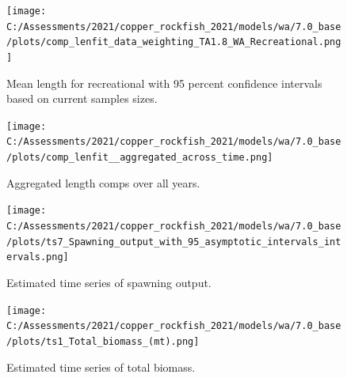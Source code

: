 \documentclass[11pt,
  english,
  a4paper,
]{article}
\begin{document}
\tagmcend\tagstructend


\begin{figure}
\centering
\texttt{[image: C:/Assessments/2021/copper\_rockfish\_2021/models/wa/7.0\_base/plots/comp\_lenfit\_data\_weighting\_TA1.8\_WA\_Recreational.png]}
\caption{Mean length for recreational with 95 percent confidence intervals based on current samples sizes.\label{fig:rec-mean-len-fit}}
\end{figure}

\tagmcend\tagstructend


\begin{figure}
\centering
\texttt{[image: C:/Assessments/2021/copper\_rockfish\_2021/models/wa/7.0\_base/plots/comp\_lenfit\_\_aggregated\_across\_time.png]}
\caption{Aggregated length comps over all years.\label{fig:agg-len-fit}}
\end{figure}

\tagmcend\tagstructend


\begin{figure}
\centering
\texttt{[image: C:/Assessments/2021/copper\_rockfish\_2021/models/wa/7.0\_base/plots/ts7\_Spawning\_output\_with\_95\_asymptotic\_intervals\_intervals.png]}
\caption{Estimated time series of spawning output.\label{fig:ssb}}
\end{figure}

\tagmcend\tagstructend


\begin{figure}
\centering
\texttt{[image: C:/Assessments/2021/copper\_rockfish\_2021/models/wa/7.0\_base/plots/ts1\_Total\_biomass\_(mt).png]}
\caption{Estimated time series of total biomass.\label{fig:tot-bio}}
\end{figure}

\tagmcend\tagstructend

\end{document}
